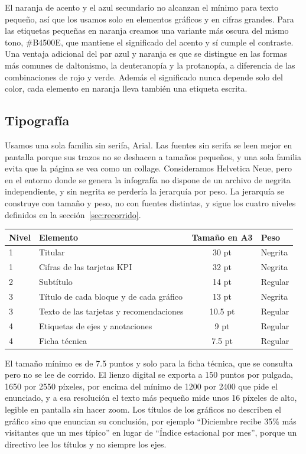 El naranja de acento y el azul secundario no alcanzan el mínimo para texto pequeño, así que los
usamos solo en elementos gráficos y en cifras grandes. Para las etiquetas pequeñas en naranja
creamos una variante más oscura del mismo tono, \#B4500E, que mantiene el significado del acento
y sí cumple el contraste. Una ventaja adicional del par azul y naranja es que se distingue en las
formas más comunes de daltonismo, la deuteranopía y la protanopía, a diferencia de las
combinaciones de rojo y verde. Además el significado nunca depende solo del color, cada elemento
en naranja lleva también una etiqueta escrita.

\subsection{Tipografía}

Usamos una sola familia sin serifa, Arial. Las fuentes sin serifa se leen mejor en pantalla
porque sus trazos no se deshacen a tamaños pequeños, y una sola familia evita que la página se vea
como un collage. Consideramos Helvetica Neue, pero en el entorno donde se genera la infografía no
dispone de un archivo de negrita independiente, y sin negrita se perdería la jerarquía por peso. La jerarquía se construye con tamaño y peso,
no con fuentes distintas, y sigue los cuatro niveles definidos en la sección~\ref{sec:recorrido}.

\begin{center}
\begin{tabular}{@{}llcl@{}}
\toprule
Nivel & Elemento & Tamaño en A3 & Peso \\
\midrule
1 & Titular & 30 pt & Negrita \\
1 & Cifras de las tarjetas KPI & 32 pt & Negrita \\
2 & Subtítulo & 14 pt & Regular \\
3 & Título de cada bloque y de cada gráfico & 13 pt & Negrita \\
3 & Texto de las tarjetas y recomendaciones & 10.5 pt & Regular \\
4 & Etiquetas de ejes y anotaciones & 9 pt & Regular \\
4 & Ficha técnica & 7.5 pt & Regular \\
\bottomrule
\end{tabular}
\end{center}

El tamaño mínimo es de 7.5 puntos y solo para la ficha técnica, que se consulta pero no se lee
de corrido. El lienzo digital se exporta a 150 puntos por pulgada, 1650 por 2550 píxeles, por
encima del mínimo de 1200 por 2400 que pide el enunciado, y a esa resolución el texto más pequeño
mide unos 16 píxeles de alto, legible en pantalla sin hacer zoom. Los
títulos de los gráficos no describen el gráfico sino que enuncian su conclusión, por ejemplo
``Diciembre recibe 35\% más visitantes que un mes típico'' en lugar de ``Índice estacional por
mes'', porque un directivo lee los títulos y no siempre los ejes.

